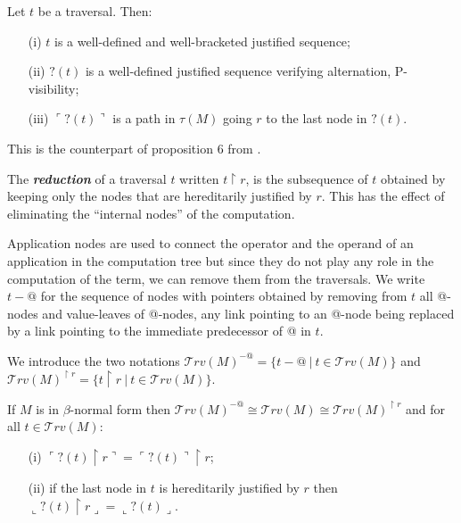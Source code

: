 \documentclass{llncs}
\newcommand\defname[1]{{\bf\em #1}\index{#1}}
\newcommand\travset{\mathcal{T}rv}
\newcommand{\oview}[1]{\llcorner #1 \lrcorner}
\newcommand{\pview}[1]{\ulcorner #1 \urcorner}
\begin{document}
\begin{proposition}
\label{prop:pviewtrav_is_path}
Let $t$ be a traversal. Then:
\begin{itemize}
\item[(i)] $t$ is a well-defined and well-bracketed justified sequence;
\item[(ii)] $?(t)$ is a well-defined justified sequence verifying alternation, P-visibility;
\item[(iii)] $\pview{?(t)}$ is a path in $\tau(M)$ going $r$ to the last node in $?(t)$.
\end{itemize}
\end{proposition}
This is the counterpart of proposition 6 from
\cite{OngHoMchecking2006}.

The \defname{reduction} of a traversal $t$ written $ t \upharpoonright r$, is the subsequence of $t$
obtained by keeping only the nodes that are hereditarily
justified by $r$. This has the effect of eliminating the ``internal nodes'' of the computation.

Application nodes are used to connect the operator and
the operand of an application in the computation tree but since they do not play
any role in the computation of the term, we can remove them from the traversals.
We write $t-@$ for the sequence of nodes with pointers obtained by
removing from $t$ all @-nodes and value-leaves of @-nodes,
any link pointing to an @-node being replaced by a link pointing to the immediate predecessor of @ in $t$.

We introduce the two notations $\travset(M)^{-@} = \{ t - @ \ | \  t \in \travset(M) \}$ and $\travset(M)^{\upharpoonright r} = \{ t  \upharpoonright r \ | \  t  \in \travset(M) \}$.

\begin{lemma}
\label{lem:redtrav_trav}
If $M$ is in $\beta$-normal form then $\travset(M)^{-@} \cong \travset(M) \cong  \travset(M)^{\upharpoonright r }$ and for all $t\in \travset(M)$:
\begin{itemize}
\item[(i)] $ \pview{?(t) \upharpoonright  r } = \pview{?(t)} \upharpoonright r$;
\item[(ii)] if the last node in $t$ is hereditarily justified by $r$ then $ \oview{?(t) \upharpoonright r } = \oview{?(t)}$.
\end{itemize}
\end{lemma}
\end{document}
